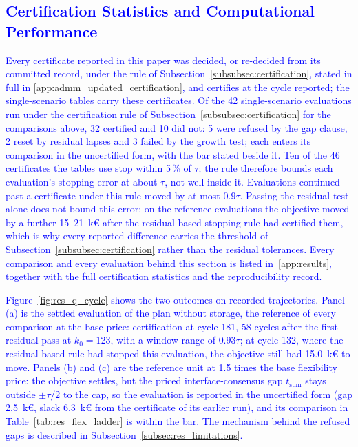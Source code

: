 \documentclass[preprint,12pt]{elsarticle}
\begin{document}
\subsection{\textcolor{blue}{Certification Statistics and Computational Performance}}
\label{subsec:res_certification}

\textcolor{blue}{
    Every certificate reported in this paper was decided, or re-decided from its committed record, under the rule of Subsection~\ref{subsubsec:certification}, stated in full in \ref{app:admm_updated_certification}, and certifies at the cycle reported; the single-scenario tables carry these certificates.
    Of the 42 single-scenario evaluations run under the certification rule of Subsection~\ref{subsubsec:certification} for the comparisons above, 32 certified and 10 did not: 5 were refused by the gap clause, 2 reset by residual lapses and 3 failed by the growth test; each enters its comparison in the uncertified form, with the bar stated beside it. Ten of the 46 certificates the tables use stop within 5\,\% of $\tau$; the rule therefore bounds each evaluation's stopping error at about $\tau$, not well inside it. Evaluations continued past a certificate under this rule moved by at most $0.9\tau$. Passing the residual test alone does not bound this error: on the reference evaluations the objective moved by a further 15--21~k\euro{} after the residual-based stopping rule had certified them, which is why every reported difference carries the threshold of Subsection~\ref{subsubsec:certification} rather than the residual tolerances. Every comparison and every evaluation behind this section is listed in~\ref{app:results}, together with the full certification statistics and the reproducibility record.
}

\textcolor{blue}{
    Figure~\ref{fig:res_q_cycle} shows the two outcomes on recorded trajectories. Panel (a) is the settled evaluation of the plan without storage, the reference of every comparison at the base price: certification at cycle 181, 58 cycles after the first residual pass at $k_0 = 123$, with a window range of $0.93\tau$; at cycle 132, where the residual-based rule had stopped this evaluation, the objective still had 15.0~k\euro{} to move. Panels (b) and (c) are the reference unit at 1.5 times the base flexibility price: the objective settles, but the priced interface-consensus gap $t_{\text{sum}}$ stays outside $\pm\tau/2$ to the cap, so the evaluation is reported in the uncertified form (gap 2.5~k\euro, slack 6.3~k\euro{} from the certificate of its earlier run), and its comparison in Table~\ref{tab:res_flex_ladder} is within the bar. The mechanism behind the refused gaps is described in Subsection~\ref{subsec:res_limitations}.
}
\end{document}
